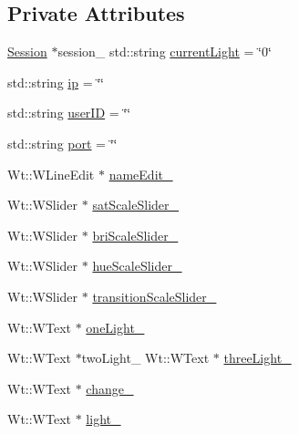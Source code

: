 \subsection*{Private Attributes}
\begin{DoxyCompactItemize}
\item 
\hyperlink{class_session}{Session} $\ast$session\+\_\+ std\+::string \hyperlink{class_lights_control_widget_a16eddbe64dce6b5fda5f52f5c35f41c0}{current\+Light} = \char`\"{}0\char`\"{}
\item 
std\+::string \hyperlink{class_lights_control_widget_aa2855e24d3d1afbcf6fcd2992abc47af}{ip} = \char`\"{}\char`\"{}
\item 
std\+::string \hyperlink{class_lights_control_widget_aa26d4553e677dec57b64575a6d6d8558}{user\+ID} = \char`\"{}\char`\"{}
\item 
std\+::string \hyperlink{class_lights_control_widget_a5760f7ec7c3c36e8faf00ae6b2633ab5}{port} = \char`\"{}\char`\"{}
\item 
Wt\+::\+W\+Line\+Edit $\ast$ \hyperlink{class_lights_control_widget_aff7b495c562df75a6006ad6bef43f96f}{name\+Edit\+\_\+}
\item 
Wt\+::\+W\+Slider $\ast$ \hyperlink{class_lights_control_widget_af957447fbfc39f4f0c87081be5cf2bf5}{sat\+Scale\+Slider\+\_\+}
\item 
Wt\+::\+W\+Slider $\ast$ \hyperlink{class_lights_control_widget_aafc30b2cc242d6ac2575128a491298d3}{bri\+Scale\+Slider\+\_\+}
\item 
Wt\+::\+W\+Slider $\ast$ \hyperlink{class_lights_control_widget_a71c03598de2481409316e7d1ca51fda0}{hue\+Scale\+Slider\+\_\+}
\item 
Wt\+::\+W\+Slider $\ast$ \hyperlink{class_lights_control_widget_af4bd66ddc5244ab9cf62dea9e5ffb1cf}{transition\+Scale\+Slider\+\_\+}
\item 
Wt\+::\+W\+Text $\ast$ \hyperlink{class_lights_control_widget_a5d33dac9a47a7862e6cc060e1e0fb335}{one\+Light\+\_\+}
\item 
Wt\+::\+W\+Text $\ast$two\+Light\+\_\+ Wt\+::\+W\+Text $\ast$ \hyperlink{class_lights_control_widget_adc837ede17eaef54ccd4b0a7e8749ebc}{three\+Light\+\_\+}
\item 
Wt\+::\+W\+Text $\ast$ \hyperlink{class_lights_control_widget_a27b0c91e6a4776c8b03dfc5324e3e365}{change\+\_\+}
\item 
Wt\+::\+W\+Text $\ast$ \hyperlink{class_lights_control_widget_a071eae068aef8f47a36e728ae3ad6378}{light\+\_\+}
\end{DoxyCompactItemize}


